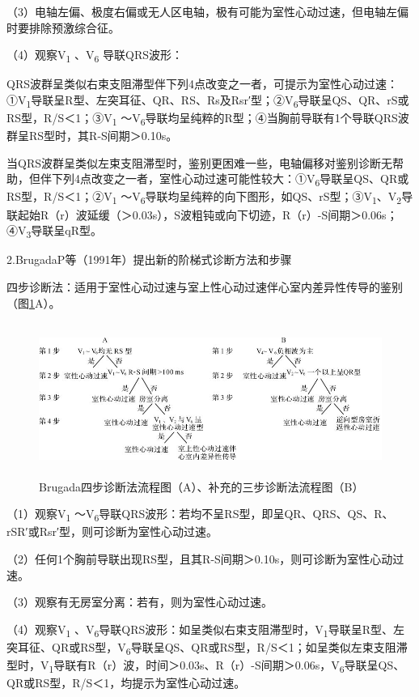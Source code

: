 （3）电轴左偏、极度右偏或无人区电轴，极有可能为室性心动过速，但电轴左偏时要排除预激综合征。

（4）观察V\textsubscript{1} 、V\textsubscript{6} 导联QRS波形：

QRS波群呈类似右束支阻滞型伴下列4点改变之一者，可提示为室性心动过速：①V\textsubscript{1}导联呈R型、左突耳征、QR、RS、Rs及Rsr′型；②V\textsubscript{6}导联呈QS、QR、rS或RS型，R/S＜1；③V\textsubscript{1} ～V\textsubscript{6}导联均呈纯粹的R型；④当胸前导联有1个导联QRS波群呈RS型时，其R-S间期＞0.10s。

当QRS波群呈类似左束支阻滞型时，鉴别更困难一些，电轴偏移对鉴别诊断无帮助，但伴下列4点改变之一者，室性心动过速可能性较大：①V\textsubscript{6}导联呈QS、QR或RS型，R/S＜1；②V\textsubscript{1} ～V\textsubscript{6}导联均呈纯粹的向下图形，如QS、rS型；③V\textsubscript{1}、V\textsubscript{2}导联起始R（r）波延缓（＞0.03s），S波粗钝或向下切迹，R（r）-S间期＞0.06s；④V\textsubscript{3}导联呈qR型。

2.BrugadaP等（1991年）提出新的阶梯式诊断方法和步骤

四步诊断法：适用于室性心动过速与室上性心动过速伴心室内差异性传导的鉴别（图\ref{fig31-9}A）。

\begin{figure}[!htbp]
 \centering
 \includegraphics[width=5.53125in,height=1.96875in]{./images/Image00512.jpg}
 \captionsetup{justification=centering}
 \caption{Brugada四步诊断法流程图（A）、补充的三步诊断法流程图（B）}
 \label{fig31-9}
  \end{figure} 

（1）观察V\textsubscript{1} ～V\textsubscript{6}导联QRS波形：若均不呈RS型，即呈QR、QRS、QS、R、rSR′或Rsr′型，则可诊断为室性心动过速。

（2）任何1个胸前导联出现RS型，且其R-S间期＞0.10s，则可诊断为室性心动过速。

（3）观察有无房室分离：若有，则为室性心动过速。

（4）观察V\textsubscript{1} 、V\textsubscript{6}导联QRS波形：如呈类似右束支阻滞型时，V\textsubscript{1}导联呈R型、左突耳征、QR或RS型，V\textsubscript{6}导联呈QS、QR或RS型，R/S＜1；如呈类似左束支阻滞型时，V\textsubscript{1}导联有R（r）波，时间＞0.03s、R（r）-S间期＞0.06s，V\textsubscript{6}导联呈QS、QR或RS型，R/S＜1，均提示为室性心动过速。

